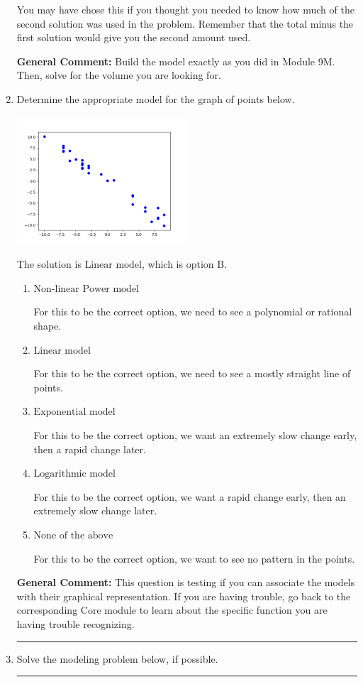 \documentclass{extbook}[14pt]
\newcommand{\litem}[1]{\item #1

\rule{\textwidth}{0.4pt}}
\begin{document}
\begin{enumerate}
{\begin{enumerate}[label=\Alph*.]
You may have chose this if you thought you needed to know how much of the second solution was used in the problem. Remember that the total minus the first solution would give you the second amount used.
\end{enumerate}

\textbf{General Comment:} Build the model exactly as you did in Module 9M. Then, solve for the volume you are looking for.
}
\litem{
Determine the appropriate model for the graph of points below.

\begin{center}
    \includegraphics[width=0.5\textwidth]{../Figures/identifyModelGraph12CopyB.png}
\end{center}


The solution is \( \text{Linear model} \), which is option B.\begin{enumerate}[label=\Alph*.]
\item \( \text{Non-linear Power model} \)

For this to be the correct option, we need to see a polynomial or rational shape.
\item \( \text{Linear model} \)

For this to be the correct option, we need to see a mostly straight line of points.
\item \( \text{Exponential model} \)

For this to be the correct option, we want an extremely slow change early, then a rapid change later.
\item \( \text{Logarithmic model} \)

For this to be the correct option, we want a rapid change early, then an extremely slow change later.
\item \( \text{None of the above} \)

For this to be the correct option, we want to see no pattern in the points.
\end{enumerate}

\textbf{General Comment:} This question is testing if you can associate the models with their graphical representation. If you are having trouble, go back to the corresponding Core module to learn about the specific function you are having trouble recognizing.
}
\litem{
Solve the modeling problem below, if possible.

}
\end{enumerate}
\end{document}
